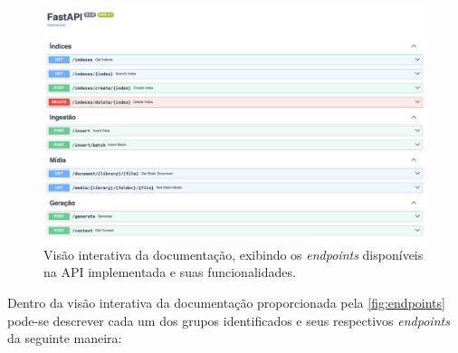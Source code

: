 \documentclass[a4paper, 12pt]{article}
\begin{document}
    \begin{figure}[ht]
        \includegraphics[width=\textwidth,height=0.9\textheight,keepaspectratio]{endpoints.png}
        \centering
        \caption{Visão interativa da documentação, exibindo os \textit{endpoints} disponíveis na API implementada e suas funcionalidades.}
        \centering
        \label{fig:endpoints}
    \end{figure}

    Dentro da visão interativa da documentação proporcionada pela \autoref{fig:endpoints} pode-se descrever cada um dos grupos identificados e seus respectivos \textit{endpoints} da seguinte maneira:
\end{document}

